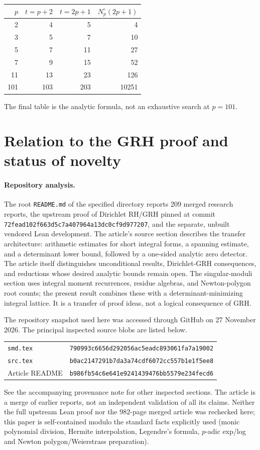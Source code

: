 \documentclass[11pt]{article}
\theoremstyle{remark}\newtheorem{remark}[theorem]{Remark}
\begin{document}
\begin{center}
\begin{tabular}{@{}rrrr@{}}
\toprule
$p$ & $t=p+2$ & $t=2p+1$ & $N_p^\circ(2p+1)$\\
\midrule
2 &4&5&4\\
3 &5&7&10\\
5 &7&11&27\\
7 &9&15&52\\
11&13&23&126\\
101&103&203&10251\\
\bottomrule
\end{tabular}
\end{center}
The final table is the analytic formula, not an exhaustive search at $p=101$.

\section{Relation to the GRH proof and status of novelty}

\paragraph{Repository analysis.}
The root \texttt{README.md} of the specified directory reports 209 merged research
reports, the upstream proof of Dirichlet RH/GRH pinned at commit
\texttt{72fead102f663d5c7a407964a13dc0cf9d977207}, and the separate, unbuilt vendored
Lean development. The article's source section \cite{source} describes the transfer
architecture: arithmetic estimates for short integral forms, a spanning estimate,
and a determinant lower bound, followed by a one-sided analytic zero detector.
The article itself distinguishes unconditional results, Dirichlet-GRH consequences,
and reductions whose desired analytic bounds remain open. The singular-moduli section
uses integral moment recurrences, residue algebras, and Newton-polygon root counts;
the present result combines these with a determinant-minimizing integral lattice.
It is a transfer of proof ideas, not a logical consequence of GRH.

The repository snapshot used here was accessed through GitHub on 27 November 2026.
The principal inspected source blobs are listed below.
\begin{center}\small\begin{tabular}{@{}ll@{}}
\texttt{smd.tex}&\texttt{790993c6656d292056ac5eadc893061fa7a19002}\\
\texttt{src.tex}&\texttt{b0ac2147291b7da3a74cdf6072cc557b1e1f5ee8}\\
Article README&\texttt{b986fb54c6e641e9241439476bb5579e234fecd6}\\
\end{tabular}\end{center}
See the accompanying provenance note for other inspected sections.
The article is a merge of earlier reports, not an independent validation of all its
claims. Neither the full upstream Lean proof nor the 982-page merged article was
rechecked here; this paper is self-contained modulo the standard facts explicitly
used (monic polynomial division, Hermite interpolation, Legendre's formula,
$p$-adic exp/log and Newton polygon/Weierstrass preparation).
\end{document}
